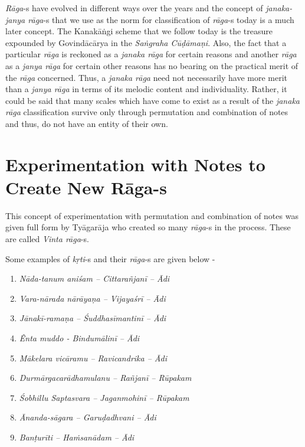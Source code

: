 \textit{Rāga}-s have evolved in different ways over the years and the concept of \textit{janaka-janya rāga}-s that we use as the norm for classification of \textit{rāga}-s today is a much later concept. The Kanakāṅgi scheme that we follow today is the treasure expounded by Govindācārya in the \textit{Saṅgraha Cūḍāmaṇi}. Also, the fact that a particular \textit{rāga} is reckoned as a \textit{janaka rāga} for certain reasons and another \textit{rāga} as a \textit{janya rāga} for certain other reasons has no bearing on the practical merit of the \textit{rāga} concerned. Thus, a \textit{janaka rāga} need not necessarily have more merit than a \textit{janya rāga} in terms of its melodic content and individuality. Rather, it could be said that many scales which have come to exist as a result of the \textit{janaka rāga} classification survive only through permutation and combination of notes and thus, do not have an entity of their own.


\section*{Experimentation with Notes to Create New Rāga-s}

This concept of experimentation with permutation and combination of notes was given full form by Tyāgarāja who created so many \textit{rāga}-s in the process. These are called \textit{Vinta rāga}-s.

Some examples of \textit{kṛti}-s and their \textit{rāga}-s are given below -

\vspace{-.3cm}

\begin{enumerate}
\itemsep=0pt
\item \textit{Nāda-tanum aniśam – Cittarañjanī – Ādi}

 \item \textit{Vara-nārada nārāyaṇa – Vijayaśrī – Ādi}

 \item \textit{Jānakī-ramaṇa – Śuddhasīmantinī – Ādi} 

 \item \textit{Ênta muddo - Bindumālinī – Ādi}

 \item \textit{Mākelara vicāramu – Ravicandrika – Ādi}

 \item \textit{Durmārgacarādhamulanu – Rañjanī – Rūpakam}

 \item \textit{Śobhillu Saptasvara – Jaganmohinī – Rūpakam}

 \item \textit{Ānanda-sāgara – Garuḍadhvani – Ādi}

 \item \textit{Banṭurīti – Haṁsanādam – Ādi}

\end{enumerate}

